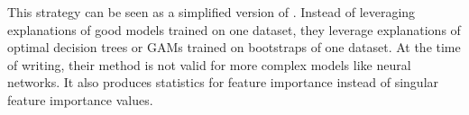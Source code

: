 \documentclass[mnsc,blindrev]{informs3}
\begin{document}
            

            This strategy can be seen as a simplified version of \citep{donnelly2023rashomon}. Instead of leveraging explanations of good models trained on one dataset, they leverage explanations of optimal decision trees or GAMs trained on bootstraps of one dataset. At the time of writing, their method is not valid for more complex models like neural networks. It also produces statistics for feature importance instead of singular feature importance values. 
    
\end{document}
